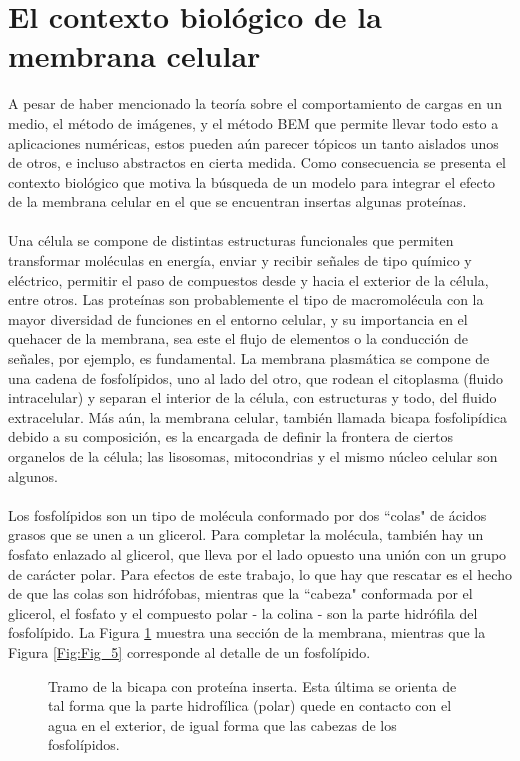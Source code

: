 \documentclass[12pt, oneside, numbers, spanish]{ezthesis}
\numberwithin{equation}{section}
\begin{document}
\section{El contexto biológico de la membrana celular}\label{Sec:Cell_Bio}
A pesar de haber mencionado la teoría sobre el comportamiento de cargas en un medio, el método de imágenes, y el método BEM que permite llevar todo esto a aplicaciones numéricas, estos pueden aún parecer tópicos un tanto aislados unos de otros, e incluso abstractos en cierta medida. Como consecuencia se presenta el contexto biológico que motiva la búsqueda de un modelo para integrar el efecto de la membrana celular en el que se encuentran insertas algunas proteínas.\\\\
Una célula se compone de distintas estructuras funcionales que permiten transformar moléculas en energía, enviar y recibir señales de tipo químico y eléctrico, permitir el paso de compuestos desde y hacia el exterior de la célula, entre otros. Las proteínas son probablemente el tipo de macromolécula con la mayor diversidad de funciones en el entorno celular, y su importancia en el quehacer de la membrana, sea este el flujo de elementos o la conducción de señales, por ejemplo, es fundamental. La membrana plasmática se compone de una cadena de fosfolípidos, uno al lado del otro, que rodean el citoplasma (fluido intracelular) y separan el interior de la célula, con estructuras y todo, del fluido extracelular. Más aún, la membrana celular, también llamada bicapa fosfolipídica debido a su composición, es la encargada de definir la frontera de ciertos organelos de la célula; las lisosomas, mitocondrias y el mismo núcleo celular son algunos.\\\\
Los fosfolípidos son un tipo de molécula conformado por dos ``colas" de ácidos grasos que se unen a un glicerol. Para completar la molécula, también hay un fosfato enlazado al glicerol, que lleva por el lado opuesto una unión con un grupo de carácter polar. Para efectos de este trabajo, lo que hay que rescatar es el hecho de que las colas son hidrófobas, mientras que la ``cabeza" conformada por el glicerol, el fosfato y el compuesto polar - la colina - son la parte hidrófila del fosfolípido. La Figura \ref{Fig:Fig_5-2} muestra una sección de la membrana, mientras que la Figura \ref{Fig:Fig_5} corresponde al detalle de un fosfolípido.
\begin{figure}[H]
	\centering
	
	\caption{Tramo de la bicapa con proteína inserta. Esta última se orienta de tal forma que la parte hidrofílica (polar) quede en contacto con el agua en el exterior, de igual forma que las cabezas de los fosfolípidos.} \label{Fig:Fig_5-2}
\end{figure}
\end{document}
